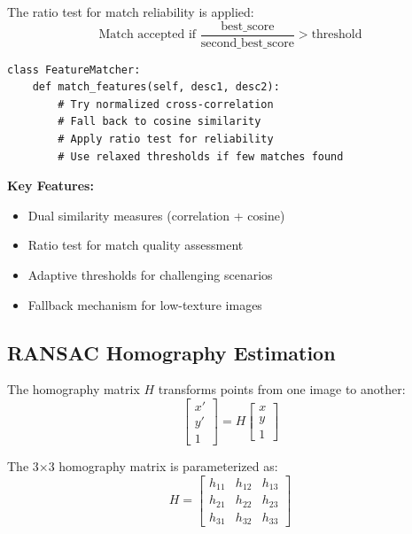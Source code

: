 \documentclass[12pt,a4paper]{article}
\begin{document}
The ratio test for match reliability is applied:
\begin{equation}
\text{Match accepted if } \frac{\text{best\_score}}{\text{second\_best\_score}} > \text{threshold}
\end{equation}

\begin{lstlisting}[caption=Feature Matching Implementation]
class FeatureMatcher:
    def match_features(self, desc1, desc2):
        # Try normalized cross-correlation
        # Fall back to cosine similarity
        # Apply ratio test for reliability
        # Use relaxed thresholds if few matches found
\end{lstlisting}

\textbf{Key Features:}
\begin{itemize}
    \item Dual similarity measures (correlation + cosine)
    \item Ratio test for match quality assessment
    \item Adaptive thresholds for challenging scenarios
    \item Fallback mechanism for low-texture images
\end{itemize}

\subsection{RANSAC Homography Estimation}

The homography matrix $H$ transforms points from one image to another:
\begin{equation}
\begin{bmatrix} x' \\ y' \\ 1 \end{bmatrix} = H \begin{bmatrix} x \\ y \\ 1 \end{bmatrix}
\end{equation}

The 3×3 homography matrix is parameterized as:
\begin{equation}
H = \begin{bmatrix}
h_{11} & h_{12} & h_{13} \\
h_{21} & h_{22} & h_{23} \\
h_{31} & h_{32} & h_{33}
\end{bmatrix}
\end{equation}
\end{document}
